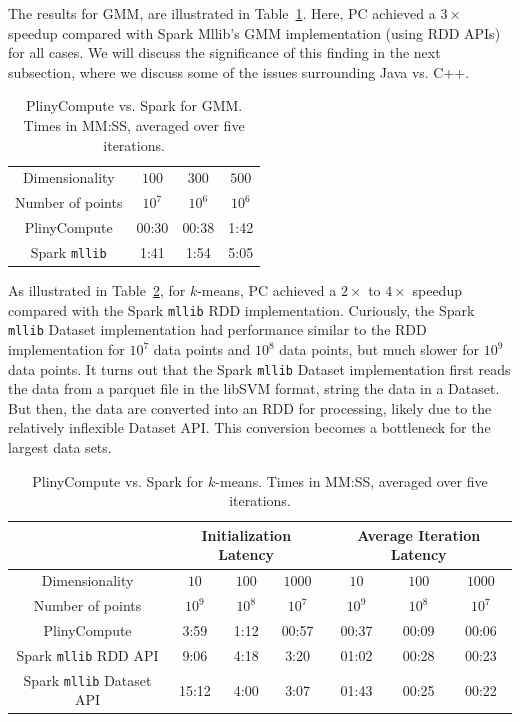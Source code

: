 The results for GMM, are illustrated in Table~\ref{fig:Gmm}. Here, PC achieved a 
$3\times$ speedup compared with Spark Mllib's GMM implementation
(using RDD APIs) for all cases.  We will discuss the significance of this finding in the next subsection, where we discuss
some of the issues surrounding Java vs. C++.  

\begin{table}[h!]
\begin{center}
\begin{tabular}{|c||c|c|c||}
\hline
Dimensionality & $100$ & $300$ & $500$ \\
Number of points & $10^7$ & $10^6$ & $10^6$ \\
\hline
\hline
PlinyCompute &00:30 & 00:38 & 1:42 \\
Spark \texttt{mllib} &1:41  &1:54 &5:05 \\
\hline
\end{tabular}
\caption{PlinyCompute vs. Spark for GMM. Times in MM:SS, averaged over five iterations.}
\label{fig:Gmm}
\end{center}
\end{table}



As illustrated in Table~\ref{fig:KMeans}, for $k$-means, PC achieved a $2\times$ to
$4\times$ speedup compared with the Spark \texttt{mllib} RDD implementation.
Curiously, the Spark \texttt{mllib} Dataset implementation
had performance similar to the RDD implementation for
$10^7$ data points and $10^8$ data
points, but much slower for $10^9$ data points. It turns out that 
the Spark \texttt{mllib} Dataset implementation first reads the data 
from a parquet file in the libSVM format, string the data in a Dataset.  But then, the data
are converted into an RDD for processing, likely due to the relatively inflexible Dataset API.
This conversion becomes a bottleneck for the largest data sets.

\begin{table}[h!]
\begin{center}
\begin{tabular}{|c||c|c|c||c|c|c||}
\hline
& \multicolumn{3}{c||}{Initialization Latency} & \multicolumn{3}{c||}{Average
                                         Iteration Latency} \\
\hline
Dimensionality & $10$ & $100$ & $1000$ & $10$ & $100$ & $1000$\\
Number of points & $10^9$ & $10^8$ & $10^7$ & $10^9$ & $10^8$ & $10^7$\\
\hline
PlinyCompute &3:59 & 1:12 & 00:57 &00:37 & 00:09 & 00:06\\
Spark \texttt{mllib} RDD API &9:06  &4:18 &3:20 &01:02 & 00:28 & 00:23\\
Spark \texttt{mllib} Dataset API &15:12  &4:00 &3:07 &01:43 & 00:25 & 00:22\\
\hline
\end{tabular}
\caption{PlinyCompute vs. Spark for $k$-means. Times in MM:SS, averaged over five iterations.}
\label{fig:KMeans}
\end{center}
\end{table}


